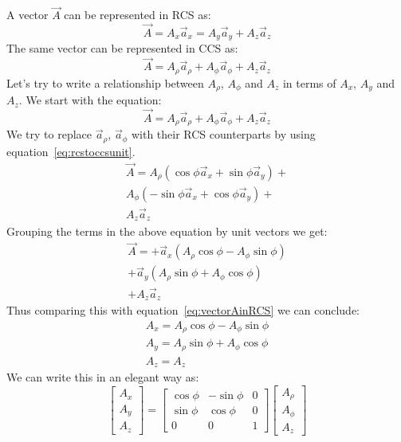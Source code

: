             A vector $\vec{A}$ can be represented in RCS as:
            \begin{equation}\label{eq:vectorAinRCS}
                \vec{A} = A_x\vec{a}_x = A_y\vec{a}_y + A_z\vec{a}_z
            \end{equation}
            The same vector can be represented in CCS as:
            $$\vec{A} = A_\rho\vec{a}_\rho + A_\phi\vec{a}_\phi + A_z\vec{a}_z$$
            Let's try to write a relationship between $A_\rho$, $A_\phi$ and $A_z$ in terms of $A_x$, $A_y$ and $A_z$.
            We start with the equation:
            $$\vec{A} = A_\rho\vec{a}_\rho + A_\phi\vec{a}_\phi + A_z\vec{a}_z$$
            We try to replace $\vec{a}_\rho$, $\vec{a}_\phi$ with their RCS counterparts by using equation~\ref{eq:rcstoccsunit}.
            \begin{align*}
                \vec{A} = A_\rho\left(\cos\phi\vec{a}_x + \sin\phi\vec{a}_y\right) + \\
                          A_\phi\left(-\sin\phi\vec{a}_x + \cos\phi\vec{a}_y\right) + \\
                          A_z\vec{a}_z
            \end{align*}
            Grouping the terms in the above equation by unit vectors we get:
            \begin{align*}
                \vec{A} =  + \vec{a}_x\left(A_\rho\cos\phi - A_\phi\sin\phi\right)\\
                           + \vec{a}_y\left(A_\rho\sin\phi + A_\phi\cos\phi\right)\\
                           + A_z\vec{a}_z
            \end{align*}
            Thus comparing this with equation~\ref{eq:vectorAinRCS} we can conclude:
            \begin{align*}
                A_x = A_\rho\cos\phi - A_\phi\sin\phi\\
                A_y = A_\rho\sin\phi + A_\phi\cos\phi\\
                A_z = A_z
            \end{align*}
            We can write this in an elegant way as:
            \begin{equation}
                \begin{bmatrix}
                    A_x \\ A_y \\ A_z
                \end{bmatrix}
                =
                \begin{bmatrix}
                    \cos\phi & -\sin\phi & 0 \\
                    \sin\phi & \cos\phi & 0 \\
                    0 & 0 & 1
                \end{bmatrix}
                \begin{bmatrix}
                    A_\rho \\ A_\phi \\ A_z
                \end{bmatrix}
            \end{equation}
